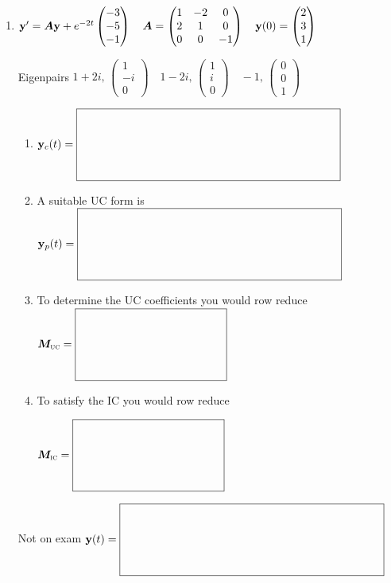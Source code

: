 \documentclass[12pt,letterpaper]{article}
\newcommand{\mat}[1]{\bm{#1}}
\newcommand{\SystemBlank}[2]{%
  \vcenter{\hbox{$\boxed{\rule{0pt}{#2}\makebox[#1]{}}$}}}
\newcommand{\VectorBlank}{\SystemBlank{3.2in}{0.80in}}
\newcommand{\MatrixBlank}{\SystemBlank{1.8in}{0.80in}}
\begin{document}
\noindent{}%
\begin{enumerate}
\item
\begingroup\setlength{\arraycolsep}{3pt}
$\vect{y}'=\mat{A}\vect{y}+e^{-2t}\begin{pmatrix}-3\\-5\\-1\end{pmatrix}\quad \mat{A}=\begin{pmatrix}1&-2&0\\2&1&0\\0&0&-1\end{pmatrix}\quad \vect{y}(0)=\begin{pmatrix}2\\3\\1\end{pmatrix}$
\par Eigenpairs $1+2i,\,\begin{pmatrix}1\\-i\\0\end{pmatrix}\quad 1-2i,\,\begin{pmatrix}1\\i\\0\end{pmatrix}\quad -1,\,\begin{pmatrix}0\\0\\1\end{pmatrix}$
\endgroup
\begin{enumerate}
\item 
$\vect{y}_c(t)=\VectorBlank$
\item A suitable UC form is
\newline
$\vect{y}_p(t)=\VectorBlank$
\item To determine the UC coefficients 
you would row reduce \newline
$\mat{M}_{\text{\textsc{uc}}}=\MatrixBlank$
\item To satisfy the IC you would row reduce
\par\noindent $\mat{M}_{\text{\textsc{ic}}}=\MatrixBlank$\par
\end{enumerate}
\vfill
Not on exam  $\vect{y}(t)=\VectorBlank$


\end{enumerate}
\end{document}
